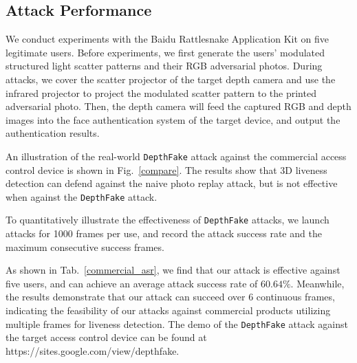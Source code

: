 
\subsection{Attack Performance}
We conduct experiments with the Baidu Rattlesnake Application Kit on five legitimate users.
Before experiments, we first generate the users' modulated structured light scatter patterns and their RGB adversarial photos.
During attacks, we cover the scatter projector of the target depth camera and use the infrared projector to project the modulated scatter pattern to the printed adversarial photo. Then, the depth camera will feed the captured RGB and depth images into the face authentication system of the target device, and output the authentication results.

An illustration of the real-world \texttt{DepthFake} attack against the commercial access control device is shown in Fig.~\ref{compare}. The results show that 3D liveness detection can defend against the naive photo replay attack, but is not effective when against the \texttt{DepthFake} attack. 

To quantitatively illustrate the effectiveness of \texttt{DepthFake} attacks,  we launch attacks for 1000 frames per use, and record the attack success rate and the maximum consecutive success frames.

As shown in Tab.~\ref{commercial_asr}, we find that our attack is effective against five users, and can achieve an average attack success rate of $60.64\%$. 
Meanwhile, the results demonstrate that our attack can succeed over 6 continuous frames, indicating the feasibility of our attacks against commercial products utilizing multiple frames for liveness detection.  The demo of the  \texttt{DepthFake} attack against the target access control device can be found at https://sites.google.com/view/depthfake.

